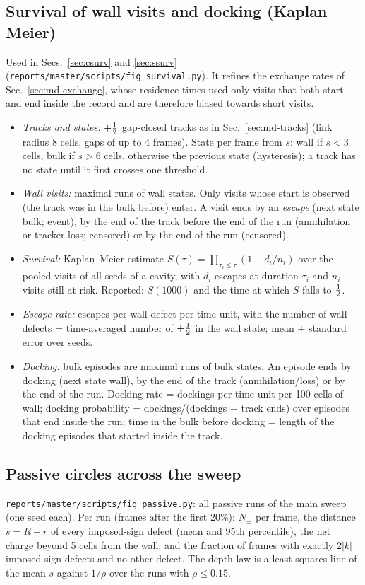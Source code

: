 \subsection{Survival of wall visits and docking (Kaplan--Meier)}\label{sec:m-surv}
Used in Secs.~\ref{sec:csurv} and \ref{sec:ssurv} (\texttt{reports/master/scripts/fig\_survival.py}). It refines the exchange
rates of Sec.~\ref{sec:md-exchange}, whose residence times used only visits that both start and end inside the record and are
therefore biased towards short visits.
\begin{itemize}
  \item \emph{Tracks and states:} $+\tfrac12$ gap-closed tracks as in Sec.~\ref{sec:md-tracks} (link radius 8 cells, gaps of up to
        4 frames). State per frame from $s$: wall if $s<3$ cells, bulk if $s>6$ cells, otherwise the previous state
        (hysteresis); a track has no state until it first crosses one threshold.
  \item \emph{Wall visits:} maximal runs of wall states. Only visits whose start is observed (the track was in the bulk before)
        enter. A visit ends by an \emph{escape} (next state bulk; event), by the end of the track before the end of the run
        (annihilation or tracker loss; censored) or by the end of the run (censored).
  \item \emph{Survival:} Kaplan--Meier estimate $S(\tau)=\prod_{\tau_i\le\tau}(1-d_i/n_i)$ over the pooled visits of all seeds of a
        cavity, with $d_i$ escapes at duration $\tau_i$ and $n_i$ visits still at risk. Reported: $S(1000)$ and the time at which
        $S$ falls to $\tfrac12$.
  \item \emph{Escape rate:} escapes per wall defect per time unit, with the number of wall defects = time-averaged number of
        $+\tfrac12$ in the wall state; mean $\pm$ standard error over seeds.
  \item \emph{Docking:} bulk episodes are maximal runs of bulk states. An episode ends by docking (next state wall), by the end of
        the track (annihilation/loss) or by the end of the run. Docking rate = dockings per time unit per 100 cells of wall;
        docking probability = dockings/(dockings + track ends) over episodes that end inside the run; time in the bulk before
        docking = length of the docking episodes that started inside the track.
\end{itemize}

\subsection{Passive circles across the sweep}\label{sec:m-passive}
\texttt{reports/master/scripts/fig\_passive.py}: all passive runs of the main sweep (one seed each). Per run (frames after
the first 20\%): $N_\pm$ per frame, the distance $s=R-r$ of every imposed-sign defect (mean and 95th percentile), the net charge
beyond 5 cells from the wall, and the fraction of frames with exactly $2|k|$ imposed-sign defects and no other defect. The depth
law is a least-squares line of the mean $s$ against $1/\rho$ over the runs with $\rho\le0.15$.

